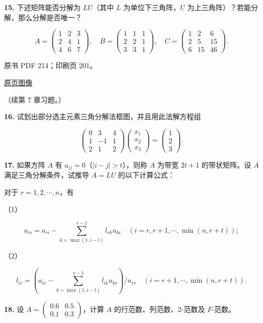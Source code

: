 \documentclass[
  10pt,
  fontset=fandol]{ctexart}
\begin{document}
\textbf{15.} 下述矩阵能否分解为 \(LU\)（其中 \(L\) 为单位下三角阵，\(U\)
为上三角阵）？若能分解，那么分解是否唯一？

\[
A=\begin{pmatrix}1&2&3\\2&4&1\\4&6&7\end{pmatrix},\quad
B=\begin{pmatrix}1&1&1\\2&2&1\\3&3&1\end{pmatrix},\quad
C=\begin{pmatrix}1&2&6\\2&5&15\\6&15&46\end{pmatrix}.
\]

\clearpage

原书 PDF 214；印刷页 201。

\href{/Users/xiangjunfeng/Desktop/数值计算专用/numerical-analysis/book/source-images/pdf-214.jpeg}{原页图像}

（续第 7 章习题。）

\textbf{16.} 试划出部分选主元素三角分解法框图，并且用此法解方程组

\[
\begin{pmatrix}0&3&4\\1&-1&1\\2&1&2\end{pmatrix}
\begin{pmatrix}x_1\\x_2\\x_3\end{pmatrix}
=\begin{pmatrix}1\\2\\3\end{pmatrix}.
\]

\textbf{17.} 如果方阵 \(A\) 有 \(a_{ij}=0\)（\(|i-j|>t\)），则称 \(A\)
为带宽 \(2t+1\) 的带状矩阵。设 \(A\) 满足三角分解条件，试推导 \(A=LU\)
的以下计算公式：

对于 \(r=1,2,\cdots,n\)，有

（1）

\[
u_{ri}=a_{ri}-\sum_{k=\max(1,i-t)}^{r-1}l_{rk}u_{ki}\quad(i=r,r+1,\cdots,\min(n,r+t));
\]

（2）

\[
l_{ir}=\left(a_{ir}-\sum_{k=\max(1,i-t)}^{r-1}l_{ik}u_{kr}\right)/u_{rr}\quad(i=r+1,\cdots,\min(n,r+t)).
\]

\textbf{18.} 设 \(A=\begin{pmatrix}0.6&0.5\\0.1&0.3\end{pmatrix}\)，计算
\(A\) 的行范数、列范数、2-范数及 \(F\)-范数。
\end{document}
